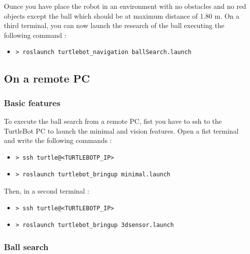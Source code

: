 \documentclass[10pt,a4paper]{article}
\begin{document}
Ounce you have place the robot in an environment with no obstacles and no red objects except the ball which should be at maximum distance of 1.80 m. On a third terminal, you can now launch the research of the ball executing the following command :

\begin{itemize}
\item[]  \begin{verbatim}> roslaunch turtlebot_navigation ballSearch.launch \end{verbatim}
\end{itemize}

\subsection{On a remote PC}

\subsubsection{Basic features}

To execute the ball search from a remote PC, fist you have to ssh to the TurtleBot PC to launch the minimal and vision features. Open a fist terminal and write the following commands :

\begin{itemize}
\item[]  \begin{verbatim}> ssh turtle@<TURTLEBOTP_IP> \end{verbatim}
\item[]  \begin{verbatim}> roslaunch turtlebot_bringup minimal.launch \end{verbatim}
\end{itemize}

Then, in a second terminal :

\begin{itemize}
\item[]  \begin{verbatim}> ssh turtle@<TURTLEBOTP_IP> \end{verbatim}
\item[]  \begin{verbatim}> roslaunch turtlebot_bringup 3dsensor.launch \end{verbatim}
\end{itemize}

\subsubsection{Ball search}
\end{document}
